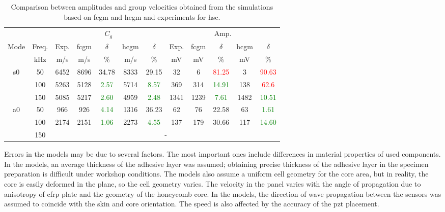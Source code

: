 \begin{table}[H]
	\small
	\tabcolsep=0.15cm
	\centering
	\caption{\label{tab:group_velocity_hsc} Comparison between amplitudes and group velocities obtained from the simulations based on \acf{fcgm} and \acf{hcgm} and experiments for \acf{hsc}.}
	\begin{tabular}{cccccccccccc}
		\toprule
		& & \multicolumn{5}{c}{\(C_g\)} & \multicolumn{5}{c}{Amp.}\\
		\multirow{2}{*}{Mode} & Freq.& Exp. & \ac{fcgm} & \(\delta\) & \ac{hcgm} & \(\delta\) &  Exp. & \ac{fcgm} & \(\delta\) & \ac{hcgm} & \(\delta\)\\
		& \unit{\kHz} & \unit[per-mode = symbol]{\m\per\s} & \unit[per-mode = symbol]{\m\per\s} & \% & \unit[per-mode = symbol]{\m\per\s} & \% & \unit{\mV} & \unit{\mV} & \%& \unit{\mV} & \% \\
		\midrule
		\multirow{3}{*}{\ac{s0}} & 50 & 6452 & 8696 & {34.78} & 8333 & {29.15} & 32 & 6 & \textcolor{red}{81.25} & 3 & \textcolor{red}{90.63}\\
		&100& 5263 & 5128 & \textcolor{green}{2.57} & 5714 & \textcolor{green}{8.57} & 369 & 314 & \textcolor{green}{14.91} & 138 & \textcolor{red}{62.6}\\
		&150& 5085 & 5217 & \textcolor{green}{2.60} & 4959 & \textcolor{green}{2.48} & 1341 & 1239 & \textcolor{green}{7.61} & 1482 & \textcolor{green}{10.51}\\
		\midrule
		\multirow{3}{*}{\ac{a0}} & 50 & 966 & 926 & \textcolor{green}{4.14} & 1316 & {36.23} & 62 & 76 & {22.58} & 63 & \textcolor{green}{1.61}\\
		& 100 & 2174 & 2151 & \textcolor{green}{1.06} & 2273 & \textcolor{green}{4.55} & 137 & 179 & {30.66} & 117 & \textcolor{green}{14.60}\\
		& 150 & \multicolumn{10}{c}{-}\\
		\bottomrule
	\end{tabular}
\end{table}
Errors in the models may be due to several factors.
The most important ones include differences in material properties of used components.
In the models, an average thickness of the adhesive layer was assumed; obtaining precise thickness of the adhesive layer in the specimen preparation is difficult under workshop conditions.
The models also assume a uniform cell geometry for the core area, but in reality, the core is easily deformed in the plane, so the cell geometry varies.
The velocity in the panel varies with the angle of propagation due to anisotropy of \ac{cfrp} plate and the geometry of the honeycomb core.
In the models, the direction of wave propagation between the sensors was assumed to coincide with the skin and core orientation.
The speed is also affected by the accuracy of the \ac{pzt} placement.


